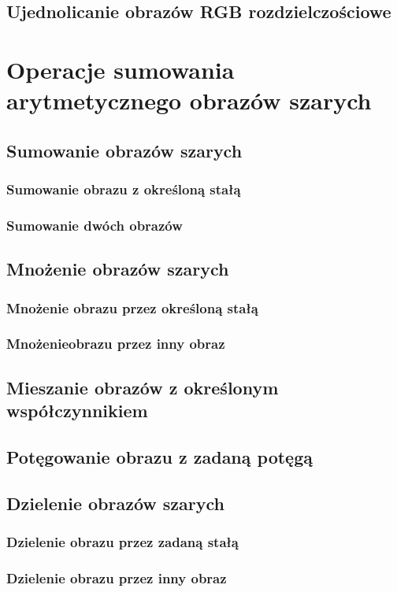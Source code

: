 \documentclass[a4paper,12pt, titlepage]{report}
\begin{document}
\section{Ujednolicanie obrazów RGB rozdzielczościowe}

\chapter{Operacje sumowania arytmetycznego obrazów szarych}
\section{Sumowanie obrazów szarych}
\subsection{Sumowanie obrazu z określoną stałą}
\subsection{Sumowanie dwóch obrazów}
\section{Mnożenie obrazów szarych}
\subsection{Mnożenie obrazu przez określoną stałą}
\subsection{Mnożenieobrazu przez inny obraz}
\section{Mieszanie obrazów z określonym współczynnikiem}
\section{Potęgowanie obrazu z zadaną potęgą}
\section{Dzielenie obrazów szarych}
\subsection{Dzielenie obrazu przez zadaną stałą}
\subsection{Dzielenie obrazu przez inny obraz}
\end{document}
